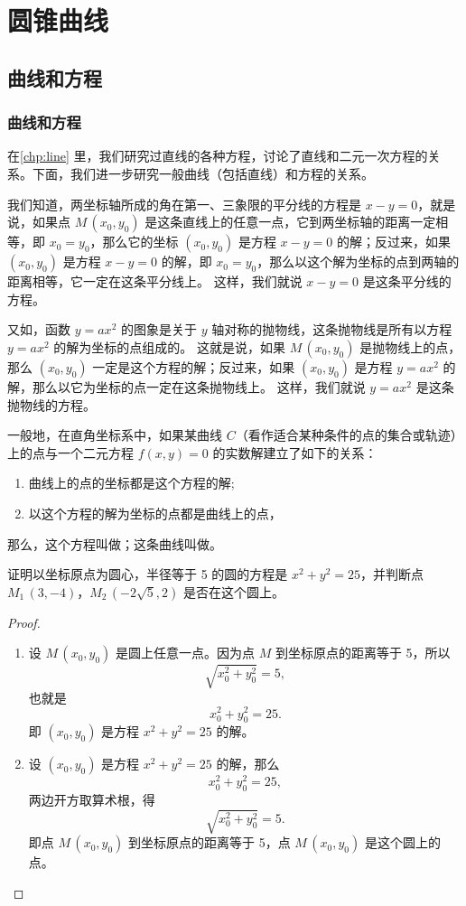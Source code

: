 \chapter{圆锥曲线}\label{chp:conic_section}
\section{曲线和方程}
\subsection{曲线和方程}\label{subsec:curve_equation}
在\cref{chp:line} 里，我们研究过直线的各种方程，讨论了直线和二元一次方程的关系。下面，我们进一步研究一般曲线（包括直线）和方程的关系。

我们知道，两坐标轴所成的角在第一、三象限的平分线的方程是 $x-y= 0$，就是说，如果点 $M\,(x_0,y_0)$ 是这条直线上的任意一点，它到两坐标轴的距离一定相等，即 $x_0=y_0$，那么它的坐标 $(x_0,y_0)$ 是方程 $x-y=0$ 的解；反过来，如果 $(x_0,y_0)$ 是方程 $x-y=0$ 的解，即 $x_0=y_0$，那么以这个解为坐标的点到两轴的距离相等，它一定在这条平分线上。
这样，我们就说 $x-y=0$ 是这条平分线的方程。

又如，函数 $y=ax^2$ 的图象是关于 $y$ 轴对称的抛物线，这条抛物线是所有以方程 $y=ax^2$ 的解为坐标的点组成的。
这就是说，如果 $M\,(x_0,y_0)$ 是抛物线上的点，那么 $(x_0,y_0)$ 一定是这个方程的解；反过来，如果 $(x_0,y_0)$ 是方程 $y=ax^2$ 的解，那么以它为坐标的点一定在这条抛物线上。
这样，我们就说 $y=ax^2$ 是这条抛物线的方程。

一般地，在直角坐标系中，如果某曲线 $C$（看作适合某种条件的点的集合或轨迹）上的点与一个二元方程 $f(x,y)= 0$ 的实数解建立了如下的关系：
\begin{enumerate}[1.]
  \item 曲线上的点的坐标都是这个方程的解;
  \item 以这个方程的解为坐标的点都是曲线上的点，
\end{enumerate}
那么，这个方程叫做；这条曲线叫做。
\begin{example}
  证明以坐标原点为圆心，半径等于 5 的圆的方程是 $x^2+y^2=25$，并判断点 $M_1\,(3,-4)$，$M_2\,(-2\sqrt{5},2)$ 是否在这个圆上。
\end{example}
\begin{proof}
  \begin{enumerate}
    \item 设 $M\,(x_0,y_0)$ 是圆上任意一点。因为点 $M$ 到坐标原点的距离等于 5，所以
    \[ \sqrt{x_0^2+y_0^2}=5,\]
    也就是
    \[ x_0^2+y_0^2=25.\]
    即 $(x_0,y_0)$ 是方程 $x^2+y^2=25$ 的解。
    \item 设 $(x_0,y_0)$ 是方程 $x^2+y^2=25$ 的解，那么
    \[ x_0^2+y_0^2=25,\]
    两边开方取算术根，得
    \[ \sqrt{x_0^2+y_0^2}=5.\]
    即点 $M\,(x_0,y_0)$ 到坐标原点的距离等于 5，点 $M\,(x_0,y_0)$ 是这个圆上的点。
  \end{enumerate}
\end{proof}

